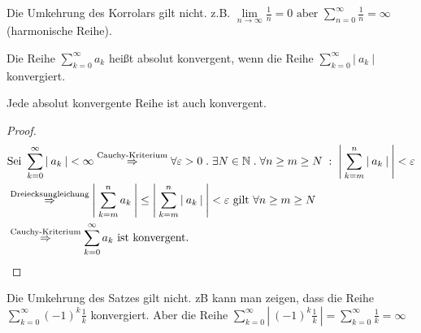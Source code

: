 \documentclass[a4paper,titlepage,oneside]{article}
\def\N{\ensuremath{\mathbb{N}} }
\renewcommand{\epsilon}{\ensuremath{\varepsilon} }
\def\sp{\hspace{0,1cm}}
\def\spdot{\sp.\sp}
\def\spcolon{\sp:\sp}
\newcommand{\suminf}[2][n]{\ensuremath{\sum_{#1= 0}^{\infty}{#2}}}
\renewcommand{\liminf}[2][n]{\ensuremath{\lim\limits_{#1 \rightarrow \infty}{#2}}}
\newcommand{\abs}[1]{\ensuremath{\left|\:#1\:\right|}}
\theoremstyle{thmstyle}
\begin{document}
\begin{subbem}
Die Umkehrung des Korrolars gilt nicht. z.B. \(\liminf{\frac{1}{n}} = 0 \text{ aber } \suminf{\frac{1}{n}} = \infty \) (harmonische Reihe).
\end{subbem}

\begin{subdefi}
Die Reihe \suminf[k]{a_k} heißt absolut konvergent, wenn die Reihe \suminf[k]{\abs{a_k}} konvergiert.
\end{subdefi}

\begin{subsatz}
Jede absolut konvergente Reihe ist auch konvergent.
\begin{proof}
\[\begin{aligned}[t]
&\text{Sei }\suminf[k]{\abs{a_k}} < \infty  \overset{\text{Cauchy-Kriterium}}{\Rightarrow} \forall \epsilon > 0 \spdot \exists N \in \N \spdot \forall n \ge m \ge N \spcolon \abs{\sum_{k=m}^{n}{\abs{a_k}}} < \epsilon \\
&\overset{\text{Dreiecksungleichung}}{\Rightarrow} \abs{\sum_{k=m}^{n}{a_k}} \le \abs{\sum_{k=m}^{n}{\abs{a_k}}} < \epsilon \text{ gilt } \forall n \ge m \ge N \\
&\overset{\text{Cauchy-Kriterium}}{\Rightarrow} \suminf[k]{a_k}\text{ ist konvergent.}
\end{aligned}\]
\end{proof}
\end{subsatz}

\begin{subbem}
Die Umkehrung des Satzes gilt nicht. zB kann man zeigen, dass die Reihe \(\suminf[k]{(-1)^k\frac{1}{k}}\) konvergiert. Aber die Reihe \(\suminf[k]{\abs{(-1)^k\frac{1}{k}}} = \suminf[k]{\frac{1}{k}} = \infty\)
\end{subbem}
\end{document}
